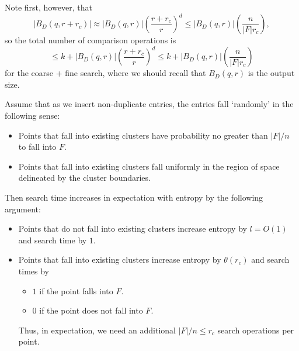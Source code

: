 \documentclass{amsbook}
\theoremstyle{definition}
\theoremstyle{remark}
\numberwithin{equation}{section}
\begin{document}
Note first, however, that
\[
    \left|B_D(q, r+r_c)\right| \approx \left|B_D(q,r)\right|\left(\frac{r+r_c}{r}\right)^d  \le \left|B_D(q,r)\right| \left( \frac{n }{|F| r_c} \right) ,
\]
so the total number of comparison operations is 
\[
    \le k + |B_D(q,r)| \left( \frac{r+r_c}{r} \right)^d   \le k + |B_D(q,r)| \left( \frac{n}{|F|r_c} \right)
\]
for the coarse + fine search, where we should recall that $B_D(q,r)$ is the output size.



Assume that as we insert non-duplicate entries, the entries fall `randomly' in the following sense:
\begin{itemize}
    \item Points that fall into existing clusters have probability no greater than $|F|/n$ to fall into $F$.
    \item Points that fall into existing clusters fall uniformly in the region of space delineated by the cluster boundaries.
\end{itemize}
Then search time increases in expectation with entropy by the following argument:
\begin{itemize}
    \item Points that do not fall into existing clusters increase entropy by $l = O(1)$  and search time by $1$.
    \item Points that fall into existing clusters increase entropy by $\theta(r_c)$ and search times by
        \begin{itemize}
            \item $1$ if the point falls into $F$.
            \item $0$ if the point does not fall into $F$.
        \end{itemize}
        Thus, in expectation, we need an additional $|F|/n \le r_c$ search operations per point.
\end{itemize}
\end{document}
